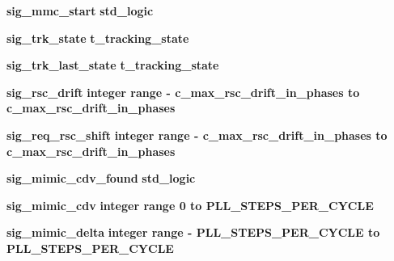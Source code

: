 \begin{DoxyCompactItemize}
\item 
{\bf sig\+\_\+mmc\+\_\+start} {\bfseries \textcolor{comment}{std\+\_\+logic}\textcolor{vhdlchar}{ }} 
\item 
{\bf sig\+\_\+trk\+\_\+state} {\bfseries {\bfseries {\bf t\+\_\+tracking\+\_\+state}} \textcolor{vhdlchar}{ }} 
\item 
{\bf sig\+\_\+trk\+\_\+last\+\_\+state} {\bfseries {\bfseries {\bf t\+\_\+tracking\+\_\+state}} \textcolor{vhdlchar}{ }} 
\item 
{\bf sig\+\_\+rsc\+\_\+drift} {\bfseries \textcolor{comment}{integer}\textcolor{vhdlchar}{ }\textcolor{vhdlchar}{ }\textcolor{vhdlchar}{ }\textcolor{keywordflow}{range}\textcolor{vhdlchar}{ }\textcolor{vhdlchar}{-\/}\textcolor{vhdlchar}{ }\textcolor{vhdlchar}{ }\textcolor{vhdlchar}{ }{\bfseries {\bf c\+\_\+max\+\_\+rsc\+\_\+drift\+\_\+in\+\_\+phases}} \textcolor{vhdlchar}{ }\textcolor{keywordflow}{to}\textcolor{vhdlchar}{ }\textcolor{vhdlchar}{ }\textcolor{vhdlchar}{ }\textcolor{vhdlchar}{ }{\bfseries {\bf c\+\_\+max\+\_\+rsc\+\_\+drift\+\_\+in\+\_\+phases}} \textcolor{vhdlchar}{ }} 
\item 
{\bf sig\+\_\+req\+\_\+rsc\+\_\+shift} {\bfseries \textcolor{comment}{integer}\textcolor{vhdlchar}{ }\textcolor{vhdlchar}{ }\textcolor{vhdlchar}{ }\textcolor{keywordflow}{range}\textcolor{vhdlchar}{ }\textcolor{vhdlchar}{-\/}\textcolor{vhdlchar}{ }\textcolor{vhdlchar}{ }\textcolor{vhdlchar}{ }{\bfseries {\bf c\+\_\+max\+\_\+rsc\+\_\+drift\+\_\+in\+\_\+phases}} \textcolor{vhdlchar}{ }\textcolor{keywordflow}{to}\textcolor{vhdlchar}{ }\textcolor{vhdlchar}{ }\textcolor{vhdlchar}{ }\textcolor{vhdlchar}{ }{\bfseries {\bf c\+\_\+max\+\_\+rsc\+\_\+drift\+\_\+in\+\_\+phases}} \textcolor{vhdlchar}{ }} 
\item 
{\bf sig\+\_\+mimic\+\_\+cdv\+\_\+found} {\bfseries \textcolor{comment}{std\+\_\+logic}\textcolor{vhdlchar}{ }} 
\item 
{\bf sig\+\_\+mimic\+\_\+cdv} {\bfseries \textcolor{comment}{integer}\textcolor{vhdlchar}{ }\textcolor{vhdlchar}{ }\textcolor{vhdlchar}{ }\textcolor{keywordflow}{range}\textcolor{vhdlchar}{ }\textcolor{vhdlchar}{ } \textcolor{vhdldigit}{0} \textcolor{vhdlchar}{ }\textcolor{keywordflow}{to}\textcolor{vhdlchar}{ }\textcolor{vhdlchar}{ }\textcolor{vhdlchar}{ }\textcolor{vhdlchar}{ }{\bfseries {\bf P\+L\+L\+\_\+\+S\+T\+E\+P\+S\+\_\+\+P\+E\+R\+\_\+\+C\+Y\+C\+LE}} \textcolor{vhdlchar}{ }} 
\item 
{\bf sig\+\_\+mimic\+\_\+delta} {\bfseries \textcolor{comment}{integer}\textcolor{vhdlchar}{ }\textcolor{vhdlchar}{ }\textcolor{vhdlchar}{ }\textcolor{keywordflow}{range}\textcolor{vhdlchar}{ }\textcolor{vhdlchar}{-\/}\textcolor{vhdlchar}{ }\textcolor{vhdlchar}{ }\textcolor{vhdlchar}{ }{\bfseries {\bf P\+L\+L\+\_\+\+S\+T\+E\+P\+S\+\_\+\+P\+E\+R\+\_\+\+C\+Y\+C\+LE}} \textcolor{vhdlchar}{ }\textcolor{keywordflow}{to}\textcolor{vhdlchar}{ }\textcolor{vhdlchar}{ }\textcolor{vhdlchar}{ }\textcolor{vhdlchar}{ }{\bfseries {\bf P\+L\+L\+\_\+\+S\+T\+E\+P\+S\+\_\+\+P\+E\+R\+\_\+\+C\+Y\+C\+LE}} \textcolor{vhdlchar}{ }} 

\end{DoxyCompactItemize}
